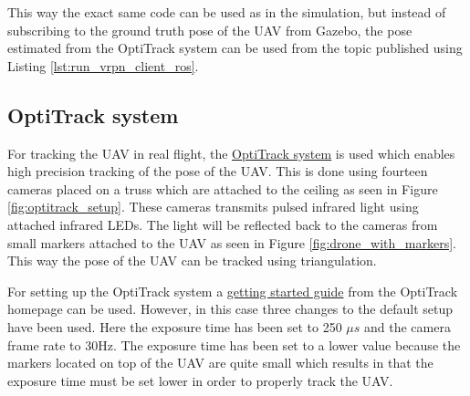 \documentclass[../Head/report.tex]{subfiles}
\begin{document}
This way the exact same code can be used as in the simulation, but instead of subscribing to the ground truth pose of the UAV from Gazebo, the pose estimated from the OptiTrack system can be used from the topic published using Listing \ref{lst:run_vrpn_client_ros}. 

\subsection{OptiTrack system}
\label{sec:optitrack_system}

For tracking the UAV in real flight, the \href{https://optitrack.com/}{OptiTrack system} is used which enables high precision tracking of the pose of the UAV. This is done using fourteen cameras placed on a truss which are attached to the ceiling as seen in Figure \ref{fig:optitrack_setup}. These cameras transmits pulsed infrared light using attached infrared LEDs. The light will be reflected back to the cameras from small markers attached to the UAV as seen in Figure \ref{fig:drone_with_markers}. This way the pose of the UAV can be tracked using triangulation. 

For setting up the OptiTrack system a \href{https://v22.wiki.optitrack.com/index.php?title=Quick\_Start\_Guide:\_Getting\_Started}{getting started guide} from the OptiTrack homepage can be used. However, in this case three changes to the default setup have been used. Here the exposure time has been set to 250 $\mu s$ and the camera frame rate to 30Hz. The exposure time has been set to a lower value because the markers located on top of the UAV are quite small which results in that the exposure time must be set lower in order to properly track the UAV. 
\end{document}
